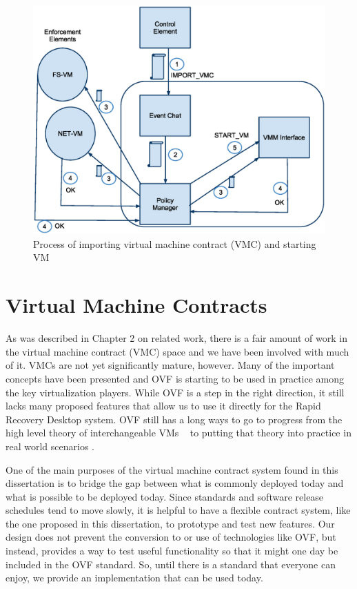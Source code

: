 \begin{figure}[tbp]
\begin{centering}
\caption{Process of importing virtual machine contract (VMC) and starting VM}
\label{fig:StartVM}
\includegraphics[scale=.7]{figs/StartVM}
\end{centering}
\end{figure}

\section{Virtual Machine Contracts}

As was described in Chapter 2 on related work, there is a fair amount of work in the virtual machine contract (VMC) space and we have been involved with much of it. VMCs are not yet significantly mature, however. Many of the important concepts have been presented \cite{virtual_machine_contract_ICAC09} and OVF is starting to be used in practice among the key virtualization players. While OVF is a step in the right direction, it still lacks many proposed features that allow us to use it directly for the Rapid Recovery Desktop system. OVF still has a long ways to go to progress from the high level theory of interchangeable VMs ~\cite{dmtf_newsletter, vmware_ovf_website, citrix_ovf_article, rhev_announce_2010} to putting that theory into practice in real world scenarios \cite {ovf_vmware_to_kvm_2010,fedora_virtAppliances, kensho_ovf_vmware_article}. 

One of the main purposes of the virtual machine contract system found in this dissertation is to bridge the gap between what is commonly deployed today and what is possible to be deployed today. Since standards and software release schedules tend to move slowly, it is helpful to have a flexible contract system, like the one proposed in this dissertation, to prototype and test new features. Our design does not prevent the conversion to or use of technologies like OVF, but instead, provides a way to test useful functionality so that it might one day be included in the OVF standard. So, until there is a standard that everyone can enjoy, we provide an implementation that can be used today. 

